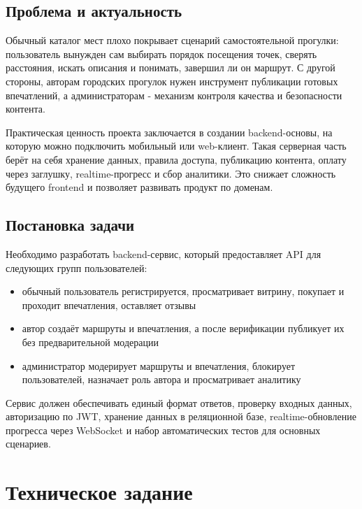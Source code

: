 \documentclass[a4paper,12pt]{extarticle}
\begin{document}
\subsection{Проблема и актуальность}

Обычный каталог мест плохо покрывает сценарий самостоятельной прогулки: пользователь вынужден сам выбирать порядок посещения точек, сверять расстояния, искать описания и понимать, завершил ли он маршрут. С другой стороны, авторам городских прогулок нужен инструмент публикации готовых впечатлений, а администраторам - механизм контроля качества и безопасности контента.

Практическая ценность проекта заключается в создании backend-основы, на которую можно подключить мобильный или web-клиент. Такая серверная часть берёт на себя хранение данных, правила доступа, публикацию контента, оплату через заглушку, realtime-прогресс и сбор аналитики. Это снижает сложность будущего frontend и позволяет развивать продукт по доменам.

\subsection{Постановка задачи}

Необходимо разработать backend-сервис, который предоставляет API для следующих групп пользователей:
\begin{itemize}
	\item обычный пользователь регистрируется, просматривает витрину, покупает и проходит впечатления, оставляет отзывы
	\item автор создаёт маршруты и впечатления, а после верификации публикует их без предварительной модерации
	\item администратор модерирует маршруты и впечатления, блокирует пользователей, назначает роль автора и просматривает аналитику
\end{itemize}

Сервис должен обеспечивать единый формат ответов, проверку входных данных, авторизацию по JWT, хранение данных в реляционной базе, realtime-обновление прогресса через WebSocket и набор автоматических тестов для основных сценариев.

\newpage

\section{Техническое задание}
\end{document}
